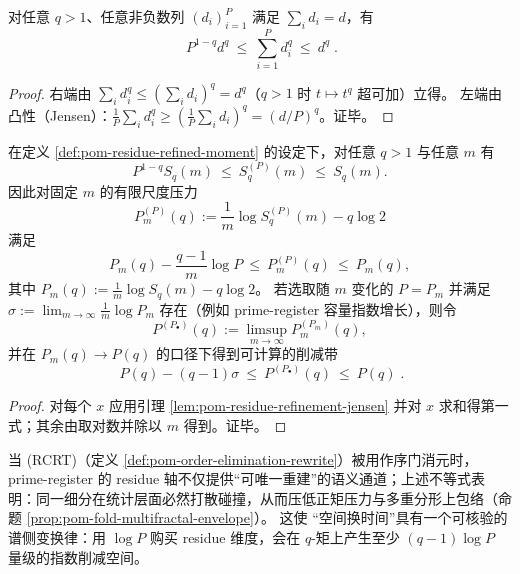 \begin{lemma}\label{lem:pom-residue-refinement-jensen}
对任意 \(q>1\)、任意非负数列 \((d_i)_{i=1}^P\) 满足 \(\sum_i d_i=d\)，有
$$
\boxed{\;
P^{1-q}d^q\ \le\ \sum_{i=1}^{P}d_i^q\ \le\ d^q\; }.
$$
\end{lemma}
\begin{proof}
右端由 \(\sum_i d_i^q\le (\sum_i d_i)^q=d^q\)（\(q>1\) 时 \(t\mapsto t^q\) 超可加）立得。
左端由凸性（Jensen）：\(\frac{1}{P}\sum_i d_i^q\ge (\frac{1}{P}\sum_i d_i)^q=(d/P)^q\)。证毕。
\end{proof}

\begin{corollary}[压力削减的显式律]\label{cor:pom-rcrt-pressure-reduction-law}
在定义 \ref{def:pom-residue-refined-moment} 的设定下，对任意 \(q>1\) 与任意 \(m\) 有
$$
P^{1-q}S_q(m)\ \le\ S_q^{(P)}(m)\ \le\ S_q(m).
$$
因此对固定 \(m\) 的有限尺度压力
$$
P_m^{(P)}(q):=\frac{1}{m}\log S_q^{(P)}(m)-q\log 2
$$
满足
$$
P_m(q)-\frac{q-1}{m}\log P\ \le\ P_m^{(P)}(q)\ \le\ P_m(q),
$$
其中 \(P_m(q):=\frac{1}{m}\log S_q(m)-q\log 2\)。
若选取随 \(m\) 变化的 \(P=P_m\) 并满足
\(
\sigma:=\lim_{m\to\infty}\frac{1}{m}\log P_m
\)
存在（例如 prime-register 容量指数增长），则令
\[
P^{(P_\bullet)}(q):=\limsup_{m\to\infty} P_m^{(P_m)}(q),
\]
并在 \(P_m(q)\to P(q)\) 的口径下得到可计算的削减带
$$
\boxed{\;
P(q)- (q-1)\sigma\ \le\ P^{(P_\bullet)}(q)\ \le\ P(q)\; }.
$$
\end{corollary}
\begin{proof}
对每个 \(x\) 应用引理 \ref{lem:pom-residue-refinement-jensen} 并对 \(x\) 求和得第一式；其余由取对数并除以 \(m\) 得到。证毕。
\end{proof}

\begin{remark}\label{rem:pom-rcrt-pressure-meaning}
当 (RCRT)（定义 \ref{def:pom-order-elimination-rewrite}）被用作序门消元时，prime-register 的 residue 轴不仅提供“可唯一重建”的语义通道；上述不等式表明：同一细分在统计层面必然打散碰撞，从而压低正矩压力与多重分形上包络（命题 \ref{prop:pom-fold-multifractal-envelope}）。
这使 “空间换时间”具有一个可核验的谱侧变换律：用 \(\log P\) 购买 residue 维度，会在 \(q\)-矩上产生至少 \((q-1)\log P\) 量级的指数削减空间。
\end{remark}

